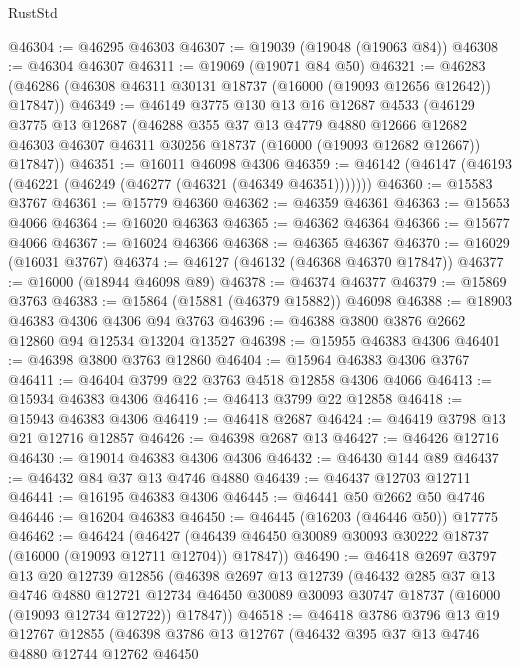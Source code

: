 \begin{lexlean}{RustStd}
\begin{coremodule}
@46304 := @46295 @46303
@46307 := @19039 (@19048 (@19063 @84))
@46308 := @46304 @46307
@46311 := @19069 (@19071 @84 @50)
@46321 := @46283 (@46286 (@46308 @46311 @30131 @18737 (@16000 (@19093 @12656 @12642)) @17847))
@46349 := @46149
    @3775
    @130
    @13
    @16
    @12687
    @4533
    (@46129
      @3775
      @13
      @12687
      (@46288
        @355
        @37
        @13
        @4779
        @4880
        @12666
        @12682
        @46303
        @46307
        @46311
        @30256
        @18737
        (@16000 (@19093 @12682 @12667))
        @17847))
@46351 := @16011 @46098 @4306
@46359 := @46142 (@46147 (@46193 (@46221 (@46249 (@46277 (@46321 (@46349 @46351)))))))
@46360 := @15583 @3767
@46361 := @15779 @46360
@46362 := @46359 @46361
@46363 := @15653 @4066
@46364 := @16020 @46363
@46365 := @46362 @46364
@46366 := @15677 @4066
@46367 := @16024 @46366
@46368 := @46365 @46367
@46370 := @16029 (@16031 @3767)
@46374 := @46127 (@46132 (@46368 @46370 @17847))
@46377 := @16000 (@18944 @46098 @89)
@46378 := @46374 @46377
@46379 := @15869 @3763
@46383 := @15864 (@15881 (@46379 @15882)) @46098
@46388 := @18903 @46383 @4306 @4306 @94 @3763
@46396 := @46388 @3800 @3876 @2662 @12860 @94 @12534 @13204 @13527
@46398 := @15955 @46383 @4306
@46401 := @46398 @3800 @3763 @12860
@46404 := @15964 @46383 @4306 @3767
@46411 := @46404 @3799 @22 @3763 @4518 @12858 @4306 @4066
@46413 := @15934 @46383 @4306
@46416 := @46413 @3799 @22 @12858
@46418 := @15943 @46383 @4306
@46419 := @46418 @2687
@46424 := @46419 @3798 @13 @21 @12716 @12857
@46426 := @46398 @2687 @13
@46427 := @46426 @12716
@46430 := @19014 @46383 @4306 @4306
@46432 := @46430 @144 @89
@46437 := @46432 @84 @37 @13 @4746 @4880
@46439 := @46437 @12703 @12711
@46441 := @16195 @46383 @4306
@46445 := @46441 @50 @2662 @50 @4746
@46446 := @16204 @46383
@46450 := @46445 (@16203 (@46446 @50)) @17775
@46462 := @46424
    (@46427 (@46439 @46450 @30089 @30093 @30222 @18737 (@16000 (@19093 @12711 @12704)) @17847))
@46490 := @46418
    @2697
    @3797
    @13
    @20
    @12739
    @12856
    (@46398
      @2697
      @13
      @12739
      (@46432
        @285
        @37
        @13
        @4746
        @4880
        @12721
        @12734
        @46450
        @30089
        @30093
        @30747
        @18737
        (@16000 (@19093 @12734 @12722))
        @17847))
@46518 := @46418
    @3786
    @3796
    @13
    @19
    @12767
    @12855
    (@46398
      @3786
      @13
      @12767
      (@46432
        @395
        @37
        @13
        @4746
        @4880
        @12744
        @12762
        @46450

\end{coremodule}
\end{lexlean}
